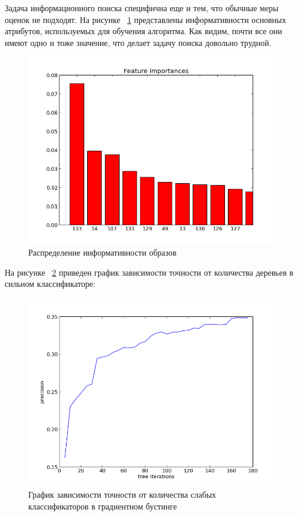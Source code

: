 Задача информационного поиска специфична еще и тем, что обычные меры оценок не подходят. На рисунке ~\ref{feature-importance-picture} представлены информативности основных атрибутов, используемых для обучения алгоритма. Как видим, почти все они имеют одно и тоже значение, что делает задачу поиска довольно трудной.

\begin{figure}[h]
  \centering
  \includegraphics[width=1.0\textwidth]{images/feature_importance.png}
  \caption{Распределение  информативности образов\label{feature-importance-picture}}
\end{figure}



На рисунке ~\ref{precision-picture} приведен график зависимости точности от количества деревьев в сильном классификаторе:

\begin{figure}[h]
  \centering
  \includegraphics[width=1.0\textwidth]{images/precision_trees.png}
  \caption{График зависимости точности от количества слабых классификаторов в градиентном бустинге\label{precision-picture}}
\end{figure}


